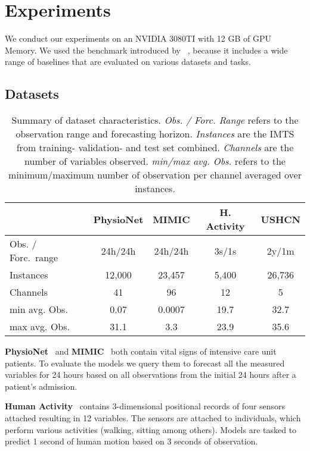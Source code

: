 \section{Experiments}

We conduct our experiments on an NVIDIA 3080TI with 12 GB of GPU Memory.
We used the benchmark introduced by \citeauthor{Zhang.Irregular}~\cite{Zhang.Irregular},
because it includes a wide range of baselines that are evaluated on various datasets and tasks. 
\subsection{Datasets}
\begin{table}
    \small
    \caption{Summary of dataset characteristics. 
            \emph{Obs. / Forc. Range} refers to the observation range and forecasting horizon.
            \emph{Instances} are the IMTS from training- validation- and test set combined.
            \emph{Channels} are the number of variables observed.
            \emph{min/max avg. Obs.} refers to the minimum/maximum number of observation per channel averaged over instances.}
    \centering
    \begin{tabular}{lcccc}
    \toprule
    & {PhysioNet} & {MIMIC} & {H. Activity} & {USHCN} \\ 
    \midrule
    Obs. / Forc.~range & 24h/24h & 24h/24h & 3s/1s & 2y/1m\\
    Instances & 12,000 & 23,457 & 5,400 & 26,736 \\ 
    Channels                 & 41                 & 96             & 12                     & 5              \\ 
    min avg. Obs. & 0.07               &  0.0007            & 19.7                   & 32.7           \\ 
    max avg. Obs. & 31.1               & 3.3            & 23.9                   & 35.6           \\ 

    \bottomrule
    \end{tabular}\label{tab:dataset_summary}
\end{table} 

\textbf{PhysioNet}~\cite{Silva2012.Predicting} and \textbf{MIMIC}~\cite{Johnson2016.MIMICIII} both contain vital signs of intensive care unit patients. 
To evaluate the models we query them to forecast all the measured variables for 24 hours based on all observations from the initial 24 hours after a patient's admission.

\textbf{Human Activity}~\cite{VedranaVidulin2010.Localization} contains 3-dimensional positional records of four sensors attached resulting in 12 variables. 
The sensors are attached to individuals, which perform various activities (walking, sitting among others). 
Models are tasked to predict 1 second of human motion based on 3 seconds of observation.

